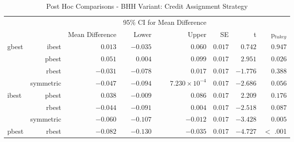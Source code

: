 \begin{table}[H]
	\centering
	\caption{Post Hoc Comparisons - BHH Variant: Credit Assignment Strategy}
	\label{tab:results:credit:post_hoc}%
	\par\bigskip
	\resizebox{\textwidth}{!}
	{
		\begin{tabular}{lrrrrrrr}
			\toprule
			\multicolumn{1}{c}{} & \multicolumn{1}{c}{} & \multicolumn{1}{c}{} & \multicolumn{2}{c}{95\% CI for Mean Difference} & \multicolumn{1}{c}{} & \multicolumn{1}{c}{} & \multicolumn{1}{c}{}               \\
			\cline{4-5}
			$ $                  & $ $                  & Mean Difference      & Lower                                           & Upper                & SE                   & t                    & p$_{tukey}$ \\
			\cmidrule[0.4pt]{1-8}
			gbest                & ibest                & $0.013$              & $-0.035$                                        & $0.060$              & $0.017$              & $0.742$              & $0.947$     \\
			$ $                  & pbest                & $0.051$              & $0.004$                                         & $0.099$              & $0.017$              & $2.951$              & $0.026$     \\
			                     & rbest                & $-0.031$             & $-0.078$                                        & $0.017$              & $0.017$              & $-1.776$             & $0.388$     \\
			                     & symmetric            & $-0.047$             & $-0.094$                                        & $7.230\times10^{-4}$ & $0.017$              & $-2.686$             & $0.056$     \\
			ibest                & pbest                & $0.038$              & $-0.009$                                        & $0.086$              & $0.017$              & $2.209$              & $0.176$     \\
			$ $                  & rbest                & $-0.044$             & $-0.091$                                        & $0.004$              & $0.017$              & $-2.518$             & $0.087$     \\
			                     & symmetric            & $-0.060$             & $-0.107$                                        & $-0.012$             & $0.017$              & $-3.428$             & $0.005$     \\
			pbest                & rbest                & $-0.082$             & $-0.130$                                        & $-0.035$             & $0.017$              & $-4.727$             & $<$ .001    \\

\end{tabular}}
\end{table}

